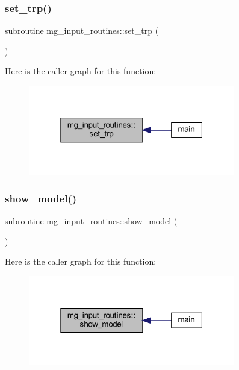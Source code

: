 \subsubsection{\texorpdfstring{set\+\_\+trp()}{set\_trp()}}
{\footnotesize\ttfamily subroutine mg\+\_\+input\+\_\+routines\+::set\+\_\+trp (\begin{DoxyParamCaption}{ }\end{DoxyParamCaption})}

Here is the caller graph for this function\+:
\nopagebreak
\begin{figure}[H]
\begin{center}
\leavevmode
\includegraphics[width=256pt]{namespacemg__input__routines_a1b72deaf9809d0b370c1a68cd01e9d32_icgraph}
\end{center}
\end{figure}
\mbox{\label{namespacemg__input__routines_a01c4f84680a9bc565592f441959beccc}} 
\subsubsection{\texorpdfstring{show\+\_\+model()}{show\_model()}}
{\footnotesize\ttfamily subroutine mg\+\_\+input\+\_\+routines\+::show\+\_\+model (\begin{DoxyParamCaption}{ }\end{DoxyParamCaption})}

Here is the caller graph for this function\+:
\nopagebreak
\begin{figure}[H]
\begin{center}
\leavevmode
\includegraphics[width=256pt]{namespacemg__input__routines_a01c4f84680a9bc565592f441959beccc_icgraph}
\end{center}
\end{figure}


